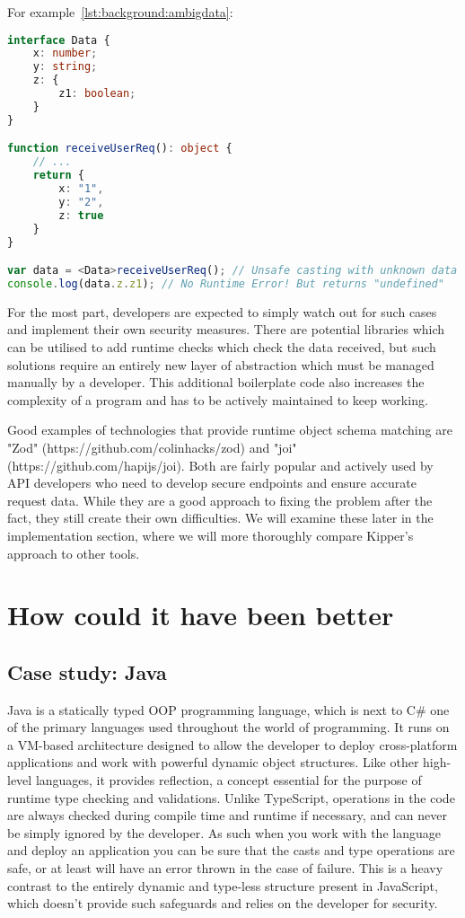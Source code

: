 For example~\ref{lst:background:ambigdata}:

\begin{lstlisting}[language=TypeScript,caption=Ambiguous dynamic data in TypeScript,label=lst:background:ambigdata]
interface Data {
	x: number;
	y: string;
	z: {
		z1: boolean;
	}
}

function receiveUserReq(): object {
	// ...
	return {
		x: "1",
		y: "2",
		z: true
	}
}

var data = <Data>receiveUserReq(); // Unsafe casting with unknown data
console.log(data.z.z1); // No Runtime Error! But returns "undefined"
\end{lstlisting}

For the most part, developers are expected to simply watch out for such cases and implement their own security measures. There are potential libraries which can be utilised to add runtime checks which check the data received, but such solutions require an entirely new layer of abstraction which must be managed manually by a developer. This additional boilerplate code also increases the complexity of a program and has to be actively maintained to keep working. 

Good examples of technologies that provide runtime object schema matching are "Zod" (https://github.com/colinhacks/zod) and "joi" (https://github.com/hapijs/joi). Both are fairly popular and actively used by API developers who need to develop secure endpoints and ensure accurate request data. While they are a good approach to fixing the problem after the fact, they still create their own difficulties. We will examine these later in the implementation section, where we will more thoroughly compare Kipper's approach to other tools.

\section{How could it have been better}

\subsection{Case study: Java}

Java is a statically typed OOP programming language, which is next to C\# one of the primary languages used throughout the world of programming. It runs on a VM-based architecture designed to allow the developer to deploy cross-platform applications and work with powerful dynamic object structures. Like other high-level languages, it provides reflection, a concept essential for the purpose of runtime type checking and validations. Unlike TypeScript, operations in the code are always checked during compile time and runtime if necessary, and can never be simply ignored by the developer. As such when you work with the language and deploy an application you can be sure that the casts and type operations are safe, or at least will have an error thrown in the case of failure. This is a heavy contrast to the entirely dynamic and type-less structure present in JavaScript, which doesn't provide such safeguards and relies on the developer for security. 


